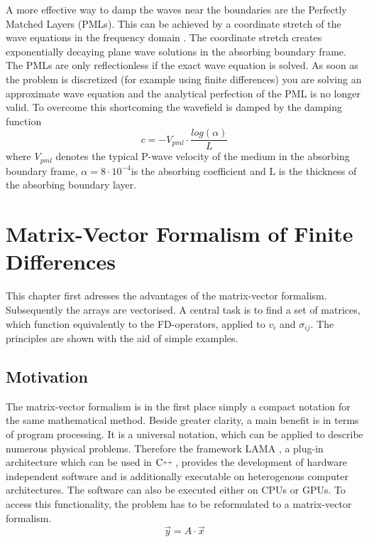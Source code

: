 \documentclass[pdftex,a4paper,parskip,listof=totoc,bibliography=totoc,onehalfspacing,12pt]{scrreprt}
\newcommand{\CC}[1][]{$\text{C\hspace{0ex}}^{_{_{_{++}}}}					%
                      \ifthenelse{\equal{#1}{}}{}{\text{\hspace{-.625ex}#1}}$}
\begin{document}
A more effective way to damp the waves near the boundaries are the Perfectly Matched Layers (PMLs). This can be achieved by a coordinate stretch of the wave equations in the frequency domain \cite{komatitsch2007unsplit}. The coordinate stretch creates exponentially decaying plane wave solutions in the absorbing boundary frame. The PMLs are only reflectionless if the exact wave equation is solved. As soon as the problem is discretized (for example using finite differences) you are solving an approximate wave equation and the analytical perfection of the PML is no longer valid. To overcome this shortcoming the wavefield is damped by the damping function 
\begin{equation}
	c=-V_{pml} \cdot \frac{log(\alpha)}{L}
\end{equation}
where $V_{pml}$ denotes the typical P-wave velocity of the medium in the absorbing boundary frame, $\alpha=8 \cdot 10^{-4}$is the absorbing coefficient and L is the thickness of the absorbing boundary layer.

\cleardoublepage
\chapter{Matrix-Vector Formalism of Finite Differences}
This chapter first adresses the advantages of the matrix-vector formalism. Subsequently the arrays are vectorised. A central task is to find a set of matrices, which function equivalently to the FD-operators, applied to $v_i$ and $\sigma_{ij}$. The principles are shown with the aid of simple examples. 
\section{Motivation}
The matrix-vector formalism is in the first place simply a compact notation for the same mathematical method. Beside greater clarity, a main benefit is in terms of program processing. It is a universal notation, which can be applied to describe numerous physical problems. Therefore the framework LAMA \citep{scai2016lama}, a plug-in architecture which can be used in \CC, provides the development of hardware independent software and is additionally executable on heterogenous computer architectures. The software can also be executed either on CPUs or GPUs. To access this functionality, the problem has to be reformulated to a matrix-vector formalism. 
\begin{equation}
	\vec{y} = A\cdot\vec{x}
\end{equation}
\end{document}
